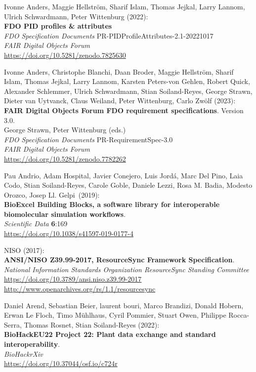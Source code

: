 \begin{thebibliography}{9}
Ivonne Anders, Maggie Hellström, Sharif Islam, Thomas Jejkal, Larry
Lannom, Ulrich Schwardmann, Peter Wittenburg (2022): \\
\textbf{{FDO PID} profiles \& attributes} \\
\emph{FDO Specification Documents} PR-PIDProfileAttributes-2.1-20221017 \\
\emph{FAIR Digital Objects Forum}\\
\url{https://doi.org/10.5281/zenodo.7825630}

Ivonne Anders, Christophe Blanchi, Daan Broder, Maggie Hellström, Sharif Islam, Thomas Jejkal, Larry Lannom, Karsten Peters-von Gehlen, Robert Quick, Alexander Schlemmer, Ulrich Schwardmann, Stian Soiland-Reyes, George Strawn, Dieter van Uytvanck, Claus Weiland, Peter Wittenburg, Carlo Zwölf (2023):\\
\textbf{{FAIR Digital Objects Forum FDO} requirement specifications}. Version 3.0.\\
George Strawn, Peter Wittenburg (eds.)\\
\emph{FDO Specification Documents} PR-RequirementSpec-3.0\\
\emph{FAIR Digital Objects Forum}\\
\url{https://doi.org/10.5281/zenodo.7782262}

Pau Andrio, Adam Hospital, Javier Conejero, Luis Jordá, Marc
Del Pino, Laia Codo, Stian Soiland-Reyes, Carole Goble, Daniele Lezzi,
Rosa M. Badia, Modesto Orozco, Josep Ll. Gelpi~(2019):\\
\textbf{BioExcel Building Blocks, a software library for interoperable
biomolecular simulation workflows}.\\
\emph{Scientific Data} \textbf{6}:169\\
\url{https://doi.org/10.1038/s41597-019-0177-4}

NISO (2017):\\
\textbf{ANSI/NISO Z39.99-2017, ResourceSync Framework Specification}.\\
\emph{National Information Standards Organization ResourceSync Standing Committee}\\
\url{https://doi.org/10.3789/ansi.niso.z39.99-2017}\\
\url{http://www.openarchives.org/rs/1.1/resourcesync}

Daniel Arend, Sebastian Beier, laurent bouri, Marco Brandizi, Donald Hobern, Erwan Le Floch, Timo Mühlhaus, Cyril Pommier, Stuart Owen, Philippe Rocca-Serra, Thomas Rosnet, Stian Soiland-Reyes (2022):\\
\textbf{BioHackEU22 Project 22: Plant data exchange and standard interoperability}.\\
\emph{BioHackrXiv}\\
\url{https://doi.org/10.37044/osf.io/c724r}


\end{thebibliography}
